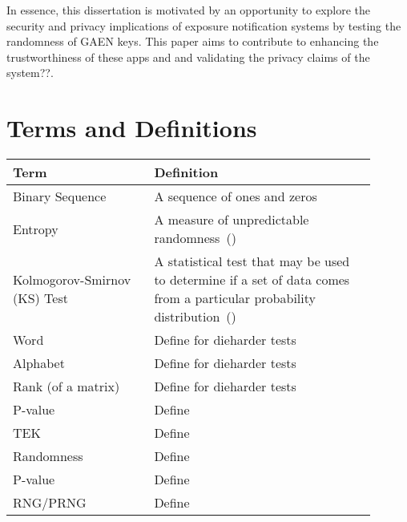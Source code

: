 In essence, this dissertation is motivated by an opportunity to explore the security and privacy implications of exposure notification systems by testing the randomness of GAEN keys. This paper aims to contribute to enhancing the trustworthiness of these apps and and validating the privacy claims of the system??.  



\section{Terms and Definitions}

\begin{table}[htbp]
\begin{tabular}{|p{0.35\linewidth}|p{0.55\linewidth}|}
\hline
\textbf{Term}               & \textbf{Definition}                                                                                               \\ \hline
Binary Sequence             & A sequence of ones and zeros                                                                                      \\ \hline
Entropy                     & A measure of unpredictable randomness~(\cite{zolfaghari2022odyssey})                                              \\ \hline
Kolmogorov-Smirnov (KS) Test    & A statistical test that may be used to determine if a set of data comes from a particular probability distribution~(\cite{nist}) \\ \hline
Word                        & Define for dieharder tests                                                                                         \\ \hline
Alphabet                    & Define for dieharder tests                                                                                         \\ \hline
Rank (of a matrix)         & Define for dieharder tests                                                                                         \\ \hline
P-value         & Define                       \\ \hline
TEK         & Define                       \\ \hline
Randomness         & Define                       \\ \hline
P-value         & Define                       \\ \hline
RNG/PRNG        & Define                       \\ \hline

\end{tabular}
\end{table}
